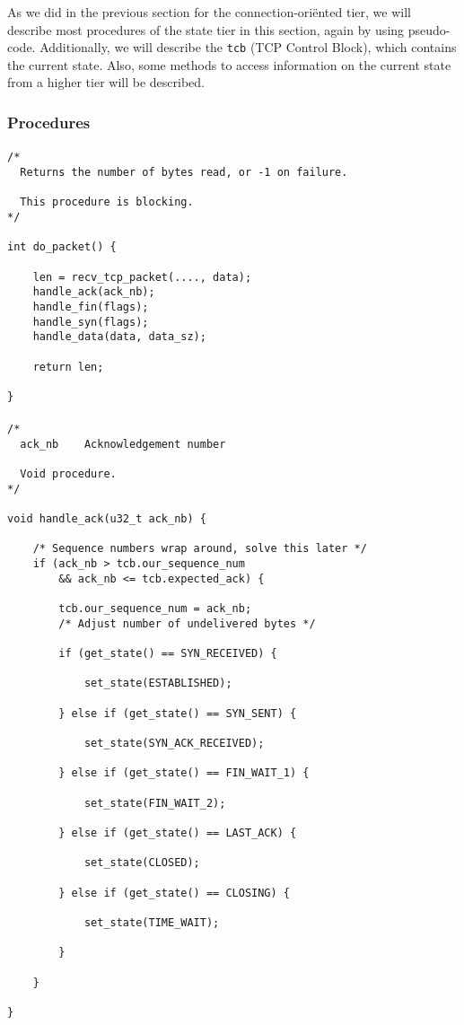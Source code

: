 \documentclass[11pt]{article}
\begin{document}
As we did in the previous section for the connection-ori\"ented tier, we
will describe most procedures of the state tier in this section, again by
using pseudo-code.
Additionally, we will describe the \verb|tcb| (TCP Control Block),
which contains the current state. Also, some methods to access information
on the current state from a higher tier will be described.


\subsubsection{Procedures}


\paragraph{}


\begin{lstlisting}[title=Procedure do\_packet]
/*
  Returns the number of bytes read, or -1 on failure.

  This procedure is blocking.
*/

int do_packet() {

    len = recv_tcp_packet(...., data);
    handle_ack(ack_nb);
    handle_fin(flags);
    handle_syn(flags);
    handle_data(data, data_sz);

    return len;

}
\end{lstlisting}


\paragraph{}


\begin{lstlisting}[title=Procedure handle\_ack]
/*
  ack_nb    Acknowledgement number

  Void procedure.
*/

void handle_ack(u32_t ack_nb) {

    /* Sequence numbers wrap around, solve this later */
    if (ack_nb > tcb.our_sequence_num
        && ack_nb <= tcb.expected_ack) {

        tcb.our_sequence_num = ack_nb;
        /* Adjust number of undelivered bytes */

        if (get_state() == SYN_RECEIVED) {

            set_state(ESTABLISHED);

        } else if (get_state() == SYN_SENT) {

            set_state(SYN_ACK_RECEIVED);

        } else if (get_state() == FIN_WAIT_1) {

            set_state(FIN_WAIT_2);

        } else if (get_state() == LAST_ACK) {

            set_state(CLOSED);

        } else if (get_state() == CLOSING) {

            set_state(TIME_WAIT);

        }

    }

}
\end{lstlisting}
\end{document}

